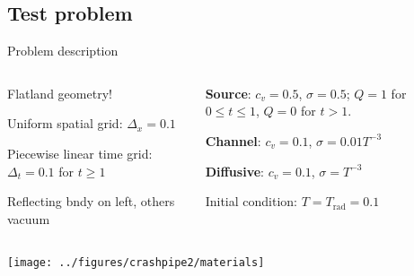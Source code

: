 \documentclass{beamer}
\begin{document}
\subsection{Test problem}
\begin{frame}{Problem description}
  \begin{columns}[t]
    \begin{column}{.48\textwidth}
      Flatland geometry!

      Uniform spatial grid: $\Delta_x=0.1$
      
      Piecewise linear time grid: $\Delta_t=0.1$ for $t \ge 1$

      Reflecting bndy on left, others vacuum
    \end{column}
    \begin{column}{.48\textwidth}
      \textcolor[rgb]{0,0,1}{\textbf{Source}}: $c_v=0.5$, $\sigma=0.5$;
      $Q=1$ for $0 \le t \le 1$, $Q=0$ for $t > 1$.

      \textcolor[rgb]{0.1,0.9,0.1}{\textbf{Channel}}: $c_v=0.1$,
      $\sigma=0.01 T^{-3}$

      \textcolor[rgb]{1,0,0}{\textbf{Diffusive}}: $c_v=0.1$,
      $\sigma=T^{-3}$

      Initial condition: $T=T_\text{rad}=0.1$
    \end{column}
  \end{columns}
\begin{center}
  \texttt{[image: ../figures/crashpipe2/materials]}
\end{center}
\end{frame}
\end{document}
